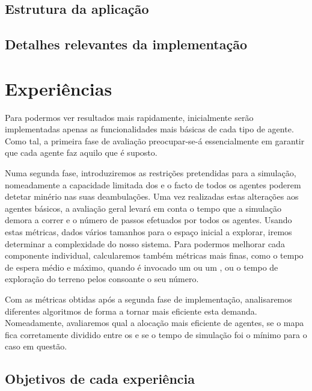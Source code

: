\documentclass[12pt]{report}
\begin{document}
\section{Estrutura da aplicação}


\section{Detalhes relevantes da implementação}


\chapter{Experiências}


Para podermos ver resultados mais rapidamente, inicialmente serão implementadas apenas as funcionalidades mais básicas de cada tipo de agente. Como tal, a primeira fase de avaliação preocupar-se-á essencialmente em garantir que cada agente faz aquilo que é suposto.

Numa segunda fase, introduziremos as restrições pretendidas para a simulação, nomeadamente a capacidade limitada dos \transporters e o facto de todos os agentes poderem detetar minério nas suas deambulações. Uma vez realizadas estas alterações aos agentes básicos, a avaliação geral levará em conta o tempo que a simulação demora a correr e o número de passos efetuados por todos os agentes. Usando estas métricas, dados vários tamanhos para o espaço inicial a explorar, iremos determinar a complexidade do nosso sistema. Para podermos melhorar cada componente individual, calcularemos também métricas mais finas, como o tempo de espera médio e máximo, quando é invocado um \producer ou um \transporter, ou o tempo de exploração do terreno pelos \spotters consoante o seu número.

Com as métricas obtidas após a segunda fase de implementação, analisaremos diferentes algoritmos de forma a tornar mais eficiente esta demanda. Nomeadamente, avaliaremos qual a alocação mais eficiente de agentes, se o mapa fica corretamente dividido entre os \spotters e se o tempo de simulação foi o mínimo para o caso em questão.

\section{Objetivos de cada experiência}
\end{document}
